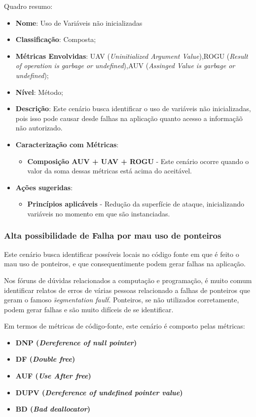 Quadro resumo:

\begin{itemize}
\item \textbf{Nome}: Uso de Variáveis não inicializadas
\item \textbf{Classificação}: Composta;
\item \textbf{Métricas Envolvidas}: UAV (\emph{Uninitialized Argument Value}),ROGU (\emph{Result of operation is garbage or undefined}),AUV (\emph{Assinged Value is garbage or undefined});
\item \textbf{Nível}: Método;
\item \textbf{Descrição}: Este cenário busca identificar o uso de variáveis não inicializadas, pois isso pode causar desde falhas na aplicação quanto acesso a informaçãõ não autorizado.
\item \textbf{Caracterização com Métricas}: 
	\begin{itemize}
	\item \textbf{Composição AUV + UAV + ROGU} - Este cenário ocorre quando o valor da soma dessas métricas está acima do aceitável.
	\end{itemize}
\item \textbf{Ações sugeridas}: 
	\begin{itemize}
	\item \textbf{Princípios aplicáveis} - Redução da superfície de ataque, inicializando variáveis no momento em que são instanciadas.
	\end{itemize}
\end{itemize}


\subsubsection{Alta possibilidade de Falha por mau uso de ponteiros}
Este cenário busca identificar possíveis locais no código fonte em que é feito o mau uso de ponteiros, e que consequentimente podem gerar falhas na aplicação. 

Nos fóruns de dúvidas relacionados a computação e programação, é muito comum identificar relatos de erros de várias pessoas relacionado a falhas de ponteiros que geram o famoso \emph{\"segmentation fault\"}. Ponteiros, se não utilizados corretamente, podem gerar falhas e são muito difíceis de se identificar.

Em termos de métricas de código-fonte, este cenário é composto pelas métricas:
\begin{itemize}
	\item \textbf{DNP (\emph{Dereference of null pointer})}
	\item \textbf{DF (\emph{Double free})}
	\item \textbf{AUF (\emph{Use After free})}
	\item \textbf{DUPV (\emph{Dereference of undefined pointer value})}
	\item \textbf{BD (\emph{Bad deallocator})}
\end{itemize}

